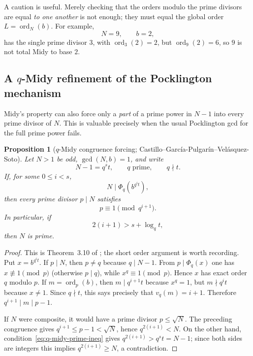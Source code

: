 \documentclass[11pt]{article}
\newtheorem{proposition}[theorem]{Proposition}
\newcommand{\ord}{\operatorname{ord}}
\begin{document}
A caution is useful.  Merely checking that the orders modulo the prime
divisors are equal \emph{to one another} is not enough; they must equal the
global order $L=\ord_N(b)$.  For example,
\[
N=9,\qquad b=2,
\]
has the single prime divisor $3$, with $\ord_3(2)=2$, but
$\ord_9(2)=6$, so $9$ is not total Midy to base $2$.

\subsection{A $q$-Midy refinement of the Pocklington mechanism}

Midy's property can also force only a \emph{part} of a prime power in
$N-1$ into every prime divisor of $N$.  This is valuable precisely when the
usual Pocklington gcd for the full prime power fails.

\begin{proposition}[$q$-Midy congruence forcing; Castillo--Garc\'ia-Pulgar\'in--Vel\'asquez-Soto]
\label{prop:q-midy-forcing}
Let $N>1$ be odd, $\gcd(N,b)=1$, and write
\[
N-1=q^s t,
\qquad q\text{ prime},\qquad q\nmid t.
\]
If, for some $0\le i<s$,
\begin{equation}
N\mid\Phi_q\!\left(b^{q^i t}\right),
\label{eq:q-midy-force}
\end{equation}
then every prime divisor $p\mid N$ satisfies
\[
p\equiv1\pmod{q^{i+1}}.
\]
In particular, if
\begin{equation}
2(i+1)>s+\log_q t,
\label{eq:q-midy-prime-ineq}
\end{equation}
then $N$ is prime.
\end{proposition}

\begin{proof}
This is Theorem~3.10 of \cite{Castillo2015}; the short order argument is worth
recording.  Put $x=b^{q^i t}$.  If $p\mid N$, then $p\ne q$ because
$q\mid N-1$.  From $p\mid\Phi_q(x)$ one has $x\not\equiv1\pmod p$ (otherwise
$p\mid q$), while $x^q\equiv1\pmod p$.  Hence $x$ has exact order $q$
modulo $p$.  If $m=\ord_p(b)$, then $m\mid q^{i+1}t$ because $x^q=1$, but
$m\nmid q^it$ because $x\ne1$.  Since $q\nmid t$, this says precisely that
$v_q(m)=i+1$.  Therefore $q^{i+1}\mid m\mid p-1$.

If $N$ were composite, it would have a prime divisor $p\le\sqrt N$.  The
preceding congruence gives $q^{i+1}\le p-1<\sqrt N$, hence
$q^{2(i+1)}<N$.  On the other hand,
condition~\eqref{eq:q-midy-prime-ineq} gives
$q^{2(i+1)}>q^s t=N-1$; since both sides are integers this implies
$q^{2(i+1)}\ge N$, a contradiction.
\end{proof}
\end{document}
